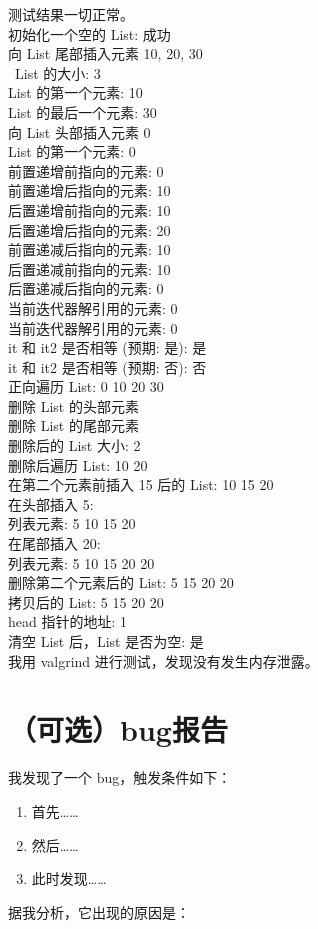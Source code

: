 \documentclass[UTF8]{ctexart}
\begin{document}
测试结果一切正常。\\ 
\small{}初始化一个空的 List: 成功\\
向 List 尾部插入元素 10, 20, 30\\\
List 的大小: 3\\
List 的第一个元素: 10\\
List 的最后一个元素: 30\\
向 List 头部插入元素 0\\
List 的第一个元素: 0\\
前置递增前指向的元素: 0\\
前置递增后指向的元素: 10\\
后置递增前指向的元素: 10\\
后置递增后指向的元素: 20\\
前置递减后指向的元素: 10\\
后置递减前指向的元素: 10\\
后置递减后指向的元素: 0\\
当前迭代器解引用的元素: 0\\
当前迭代器解引用的元素: 0\\
it 和 it2 是否相等 (预期: 是): 是\\
it 和 it2 是否相等 (预期: 否): 否\\
正向遍历 List: 0 10 20 30 \\
删除 List 的头部元素\\
删除 List 的尾部元素\\
删除后的 List 大小: 2\\
删除后遍历 List: 10 20 \\
在第二个元素前插入 15 后的 List: 10 15 20 \\
在头部插入 5:\\
列表元素: 5 10 15 20 \\
在尾部插入 20:\\
列表元素: 5 10 15 20 20 \\
删除第二个元素后的 List: 5 15 20 20 \\
拷贝后的 List: 5 15 20 20 \\
head 指针的地址: 1\\
清空 List 后，List 是否为空: 是\\

\Large{我用 valgrind 进行测试，发现没有发生内存泄露。}
\large{}
\section{（可选）bug报告}

我发现了一个 bug，触发条件如下：

\begin{enumerate}
    \item 首先……
    \item 然后……
    \item 此时发现……
\end{enumerate}

据我分析，它出现的原因是：
\end{document}
